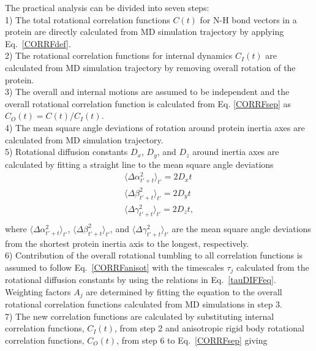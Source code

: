 \documentclass[journal=jpcbfk,manuscript=article]{achemso}
\begin{document}
The practical analysis can be divided into seven steps: \\
1) The total rotational correlation functions $C(t)$
for N-H bond vectors in a protein are directly calculated from MD simulation trajectory
by applying Eq.~\ref{CORRFdef}. \\
2) The rotational correlation functions for internal
dynamics $C_I(t)$ are calculated from MD simulation trajectory
by removing overall rotation of the protein. \\
3) The overall and internal motions are assumed to be independent and the overall
rotational correlation function is calculated from Eq. \ref{CORRFsep} as $C_O(t)=C(t)/C_I(t)$. \\
4) The mean square angle deviations of rotation around protein inertia axes
are calculated from MD simulation trajectory. \\
5) Rotational diffusion constants $D_x$, $D_y$, and $D_z$ around inertia axes
are calculated by fitting a straight line to the mean square angle deviations 
\begin{equation}\label{DIFFdef}
  \begin{aligned}
    \langle \Delta \alpha_{t'+t}^2 \rangle_{t'} = 2 D_{x} t \\
    \langle \Delta \beta_{t'+t}^2 \rangle_{t'} = 2 D_{y} t \\
    \langle \Delta \gamma_{t'+t}^2 \rangle_{t'} = 2 D_{z} t, \\
  \end{aligned}
\end{equation}
where $\langle \Delta \alpha_{t'+t}^2 \rangle_{t'}$,
$\langle \Delta \beta_{t'+t}^2 \rangle_{t'}$, and
$\langle \Delta \gamma_{t'+t}^2 \rangle_{t'}$ are
the mean square angle deviations from the shortest protein
inertia axis to the longest, respectively.\\
6) Contribution of the overall rotational tumbling to all correlation
functions is assumed to follow Eq.~\ref{CORRFanisot} with the
timescales $\tau_j$ calculated from the rotational diffusion constants
by using the relations in Eq.~\ref{tauDIFFeq}.
Weighting factors $A_j$ are determined by fitting the equation %
to the overall rotational correlation functions calculated from MD simulations in step 3. \\
7) The new correlation functions are calculated by substituting
internal correlation functions, $C_I(t)$, from step 2 and anisotropic rigid body
rotational correlation functions, $C_O(t)$, from step 6 to
Eq.~\ref{CORRFsep} giving
\end{document}
